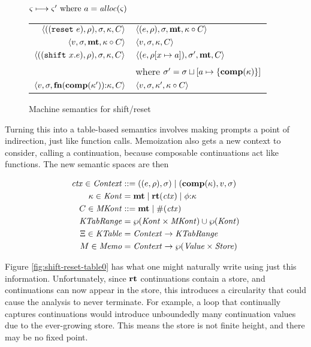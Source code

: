\begin{figure}
  \centering
  $\varsigma \longmapsto \varsigma' \text{ where } a = \mathit{alloc}(\varsigma)$ \\
  \begin{tabular}{r|l}
    \hline
    $\langle ((\texttt{reset}\ e), \rho), \sigma, \kappa, C \rangle$
    &
    $\langle (e, \rho), \sigma, \mathbf{mt}, \kappa\circ C \rangle$
    \\
    $\langle v, \sigma, \mathbf{mt}, \kappa\circ C \rangle$
    &
    $\langle v, \sigma, {\kappa}, {C} \rangle$
    \\
    $\langle ((\texttt{shift}\ x. e), \rho), \sigma, \kappa, C \rangle$
    &
    $\langle (e, \rho[x \mapsto a]), \sigma',\mathbf{mt},C \rangle$
    \\ & where $\sigma' = \sigma\sqcup[a \mapsto \{ \mathbf{comp}(\kappa) \}]$
    \\
    $\langle v,\sigma,\mathbf{fn}{}(\mathbf{comp}(\kappa')){\tt :} \kappa, C \rangle$
    &
    $\langle v, \sigma, \kappa', \kappa\circ C \rangle$
  \end{tabular}  
  \caption{Machine semantics for shift/reset}
  \label{fig:shift-reset}
\end{figure}

Turning this into a table-based semantics involves making prompts a point of indirection, just like function calls.
%
Memoization also gets a new context to consider, calling a continuation, because composable continuations act like functions.
%
The new semantic spaces are then

\begin{align*}
  \mathit{ctx} \in \mathit{Context} &::= ((e,\rho),\sigma) \mid (\mathbf{comp}(\kappa),v,\sigma) \\
  \kappa \in \mathit{Kont} &= \mathbf{mt} \mid \mathbf{rt}(\mathit{ctx}) \mid \phi{\tt :} \kappa \\
  C \in \mathit{MKont} &::= \mathbf{mt} \mid \#(\mathit{ctx}) \\
  \mathit{KTabRange} &= \wp(\mathit{Kont} \times \mathit{MKont}) \cup \wp(\mathit{Kont}) \\
  \Xi \in \mathit{KTable} &= \mathit{Context} \to \mathit{KTabRange} \\
  M \in \mathit{Memo} &= \mathit{Context} \to \wp(\mathit{Value} \times \mathit{Store})
\end{align*}

Figure \ref{fig:shift-reset-table0} has what one might naturally write using just this information.
%
Unfortunately, since $\mathbf{rt}$ continuations contain a store, and continuations can now appear in the store, this introduces a circularity that could cause the analysis to never terminate.
%
For example, a loop that continually captures continuations would introduce unboundedly many continuation values due to the ever-growing store.
%
This means the store is not finite height, and there may be no fixed point.

